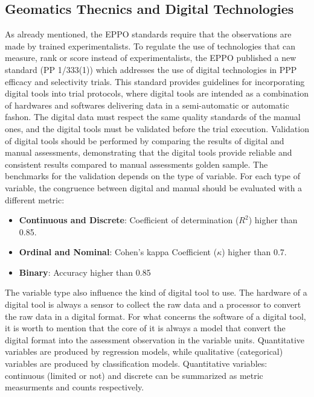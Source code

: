 \documentclass[12pt,a4paper,oneside]{report}
\begin{document}
\subsection{Geomatics Thecnics and Digital Technologies}

As already mentioned, the EPPO standards require that the
observations are made by trained experimentalists.
To regulate the use of technologies that can measure, rank or score instead of 
experimentalists, the EPPO published a new standard (PP 1/333(1)\cite{PP1333}) which 
addresses the use of digital technologies in PPP efficacy and selectivity trials.
This standard provides guidelines for incorporating digital
tools into trial protocols, where digital tools are intended as a combination of
hardwares and softwares delivering data 
in a semi-automatic or automatic fashon.
The digital data must respect the same quality standards of the manual
ones, and the digital tools must be validated before the trial execution.
Validation of digital tools should
be performed by comparing the results of digital and manual assessments, 
demonstrating that the digital tools provide reliable and consistent
results compared to manual assessments golden sample. 
The benchmarks for the validation depends
on the type of variable. For each type of variable, the congruence between 
digital and manual should be evaluated with a different metric:

\begin{itemize}
    \item \textbf{Continuous and Discrete}: Coefficient of determination ($R^2$) higher than 0.85.
    \item \textbf{Ordinal and Nominal}: Cohen's kappa Coefficient ($\kappa$) higher than 0.7.
    \item \textbf{Binary}: Accuracy higher than 0.85
\end{itemize}

The variable type also influence the kind of digital tool to use.
The hardware of a digital tool is always a sensor to collect the raw data and a
processor to convert the raw data in a digital format.
For what concerns the software of a digital tool, it is worth to mention that
the core of it is always a model that convert the digital format into the assessment
observation in the variable units.
Quantitative variables are produced by regression models, while qualitative (categorical) 
variables are produced by classification models. 
Quantitative variables: continuous (limited or not) and discrete
can be summarized as metric measurments and counts respectively.
\end{document}
